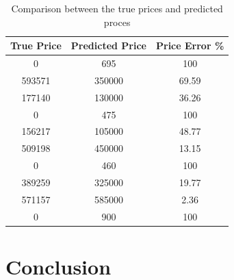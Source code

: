 \documentclass[12pt,twoside]{report}
\begin{document}
\begin{table}[h]
	\centering
	\caption{Comparison between the true prices and predicted proces}
	\label{basic_model_prediction_price}
	\begin{tabular}{| c | c | c |}
		\hline
		True Price & Predicted Price & Price Error \% \\
		\hline
		0 & 695 & 100 \\
		\hline
		593571 & 350000 & 69.59 \\
		\hline
		177140 & 130000 & 36.26 \\
		\hline
		0 & 475 & 100 \\
		\hline
		156217 & 105000 & 48.77 \\
		\hline
		509198 & 450000 & 13.15 \\
		\hline
		0 & 460 & 100 \\ 
		\hline
		389259 & 325000 & 19.77 \\
		\hline
		571157 & 585000 & 2.36 \\
		\hline
		0 & 900 & 100 \\
		\hline
	\end{tabular}
\end{table}


\chapter{Conclusion}




\end{document}
